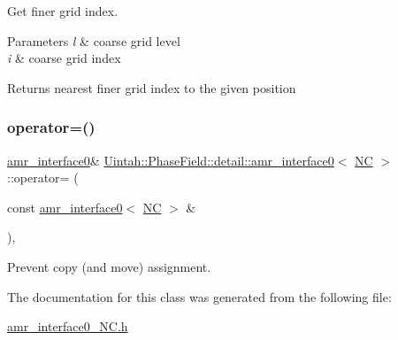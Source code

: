 Get finer grid index. 


\begin{DoxyParams}{Parameters}
{\em l} & coarse grid level \\
\hline
{\em i} & coarse grid index \\
\hline
\end{DoxyParams}
\begin{DoxyReturn}{Returns}
nearest finer grid index to the given position 
\end{DoxyReturn}
\mbox{\label{classUintah_1_1PhaseField_1_1detail_1_1amr__interface0_3_01NC_01_4_a9aaf0ac9821706c4d1b07b879c9f2937}} 
\subsubsection{\texorpdfstring{operator=()}{operator=()}}
{\footnotesize\ttfamily \hyperlink{classUintah_1_1PhaseField_1_1detail_1_1amr__interface0}{amr\+\_\+interface0}\& \hyperlink{classUintah_1_1PhaseField_1_1detail_1_1amr__interface0}{Uintah\+::\+Phase\+Field\+::detail\+::amr\+\_\+interface0}$<$ \hyperlink{namespaceUintah_1_1PhaseField_a33d355affda78a83f45755ba8388cedda77924170fe82bfd58b74ca3e44139718}{NC} $>$\+::operator= (\begin{DoxyParamCaption}\item[{const \hyperlink{classUintah_1_1PhaseField_1_1detail_1_1amr__interface0}{amr\+\_\+interface0}$<$ \hyperlink{namespaceUintah_1_1PhaseField_a33d355affda78a83f45755ba8388cedda77924170fe82bfd58b74ca3e44139718}{NC} $>$ \&}]{ }\end{DoxyParamCaption})\hspace{0.3cm}{\ttfamily [protected]}, {\ttfamily [delete]}}



Prevent copy (and move) assignment. 



The documentation for this class was generated from the following file\+:\begin{DoxyCompactItemize}
\item 
\hyperlink{amr__interface0__NC_8h}{amr\+\_\+interface0\+\_\+\+N\+C.\+h}\end{DoxyCompactItemize}
